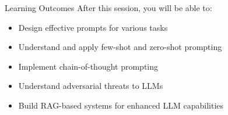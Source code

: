\begin{frame}{Learning Outcomes}
  After this session, you will be able to:
  \begin{itemize}
    \item[\textcolor{red}{$\blacktriangleright$}] Design effective prompts for various tasks
    \item[\textcolor{red}{$\blacktriangleright$}] Understand and apply few-shot and zero-shot prompting
    \item[\textcolor{red}{$\blacktriangleright$}] Implement chain-of-thought prompting
    \item[\textcolor{red}{$\blacktriangleright$}] Understand adversarial threats to LLMs
    \item[\textcolor{red}{$\blacktriangleright$}] Build RAG-based systems for enhanced LLM capabilities
  \end{itemize}
\end{frame}
